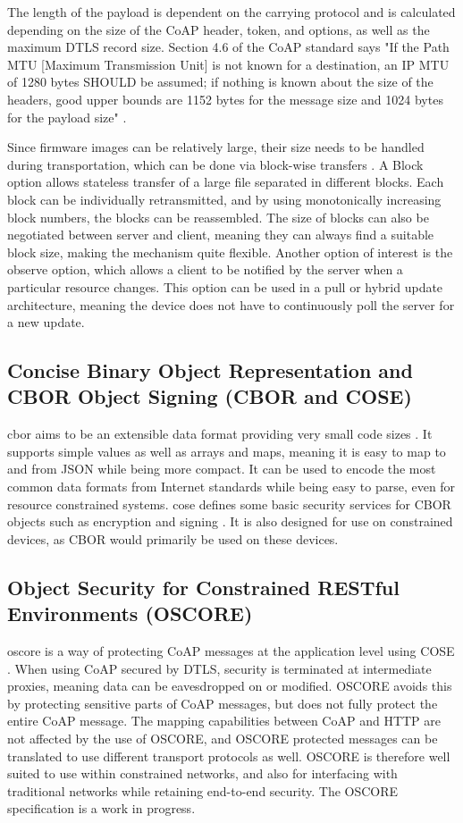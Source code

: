 \documentclass[0-thesis.tex]{subfiles}
\begin{document}
The length of the payload is dependent on the carrying protocol and is calculated
depending on the size of the CoAP header, token, and options, as well as the maximum DTLS
record size. Section 4.6 of the CoAP standard says "If the Path MTU [Maximum Transmission
Unit] is not known for a destination, an IP MTU of 1280 bytes SHOULD be assumed; if
nothing is known about the size of the headers, good upper bounds are 1152 bytes for the
message size and 1024 bytes for the payload size" \parencite{rfc7252}.

Since firmware images can be relatively large, their size needs to be handled during
transportation, which can be done via block-wise transfers \parencite{rfc7959}. A Block
option allows stateless transfer of a large file separated in different blocks. Each block
can be individually retransmitted, and by using monotonically increasing block numbers, the
blocks can be reassembled. The size of blocks can also be negotiated between server and
client, meaning they can always find a suitable block size, making the mechanism quite
flexible. Another option of interest is the observe option, which allows a client to be
notified by the server when a particular resource changes. This option can be used in a
pull or hybrid update architecture, meaning the device does not have to continuously poll
the server for a new update.

\subsection{Concise Binary Object Representation and CBOR Object Signing (CBOR and COSE)}
\label{ssec:cbor-and-cose}
\gls{cbor} aims to be an extensible data format providing very small code sizes
\parencite{rfc7049}. It supports simple values as well as arrays and maps, meaning it is
easy to map to and from JSON while being more compact. It can be used to encode the most
common data formats from Internet standards while being easy to parse, even for resource
constrained systems. \gls{cose} defines some basic security services for CBOR objects such
as encryption and signing \parencite{rfc8152}. It is also designed for use on
constrained devices, as CBOR would primarily be used on these devices.

\subsection{Object Security for Constrained RESTful Environments (OSCORE)}
\label{ssec:oscore}
\gls{oscore} is a way of protecting CoAP messages at the application level using COSE
\parencite{oscore}. When using CoAP secured by DTLS, security is terminated at
intermediate proxies, meaning data can be eavesdropped on or modified. OSCORE avoids this
by protecting sensitive parts of CoAP messages, but does not fully protect the entire CoAP
message. The mapping capabilities between CoAP and HTTP are not affected by the use of
OSCORE, and OSCORE protected messages can be translated to use different transport
protocols as well. OSCORE is therefore well suited to use within constrained networks, and
also for interfacing with traditional networks while retaining end-to-end security. The
OSCORE specification is a work in progress.
\end{document}
